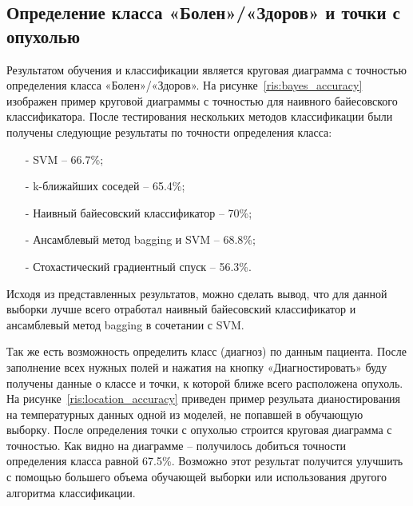 \subsection{Определение класса «Болен»/«Здоров» и точки с опухолью}
Результатом обучения и классификации является круговая диаграмма с точностью определения класса «Болен»/«Здоров». На рисунке~\ref{ris:bayes_accuracy} изображен пример круговой диаграммы с точностью для наивного байесовского классификатора.
После тестирования нескольких методов классификации были получены следующие результаты по точности определения класса:
\begin{itemize}
	\item[-] SVM -- 66.7\%;
	\item[-] k-ближайших соседей -- 65.4\%;
	\item[-] Наивный байесовский классификатор -- 70\%;
	\item[-] Ансамблевый метод bagging и SVM -- 68.8\%;
	\item[-] Стохастический градиентный спуск -- 56.3\%.
\end{itemize}
\par
Исходя из представленных результатов, можно сделать вывод, что для данной выборки лучше всего отработал наивный байесовский классификатор и ансамблевый метод bagging в сочетании с SVM.
\par
Так же есть возможность определить класс (диагноз) по данным пациента. После заполнение всех нужных полей и нажатия на кнопку «Диагностировать» буду получены данные о классе и точки, к которой ближе всего расположена опухоль. На рисунке~\ref{ris:location_accuracy} приведен пример резульата дианостирования на температурных данных одной из моделей, не попавшей в обучающую выборку. После определения точки с опухолью строится круговая диаграмма с точностью. 
Как видно на диаграмме -- получилось добиться точности определения класса равной 67.5\%. Возможно этот результат получится улучшить с помощью большего объема обучающей выборки или использования другого алгоритма классификации.

